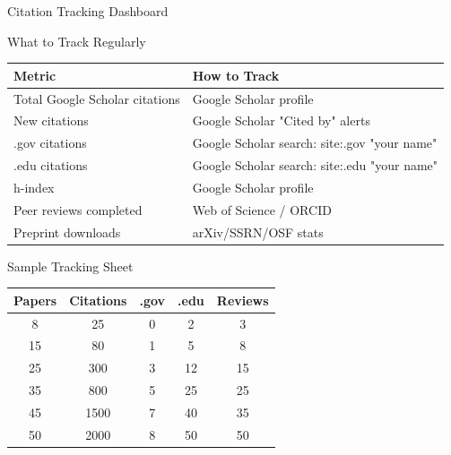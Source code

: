 \documentclass[11pt]{beamer}
\begin{document}
	\begin{frame}{Citation Tracking Dashboard}
		\scriptsize
		\begin{block}{What to Track Regularly}
			\centering
			\begin{tabular}{|p{4cm}|p{5.5cm}|}
				\hline
				\textbf{Metric} & \textbf{How to Track} \\
				\hline
				Total Google Scholar citations & Google Scholar profile \\
				\hline
				New citations & Google Scholar "Cited by" alerts \\
				\hline
				.gov citations & Google Scholar search: site:.gov "your name" \\
				\hline
				.edu citations & Google Scholar search: site:.edu "your name" \\
				\hline
				h-index & Google Scholar profile \\
				\hline
				Peer reviews completed & Web of Science / ORCID \\
				\hline
				Preprint downloads & arXiv/SSRN/OSF stats \\
				\hline
			\end{tabular}
		\end{block}
		\begin{block}{Sample Tracking Sheet}
			\centering
			\begin{tabular}{|c|c|c|c|c|}
				\hline
				\textbf{Papers} & \textbf{Citations} & \textbf{.gov} & \textbf{.edu} & \textbf{Reviews} \\
				\hline
				8 & 25 & 0 & 2 & 3 \\
				\hline
				15 & 80 & 1 & 5 & 8 \\
				\hline
				25 & 300 & 3 & 12 & 15 \\
				\hline
				35 & 800 & 5 & 25 & 25 \\
				\hline
				45 & 1500 & 7 & 40 & 35 \\
				\hline
				50 & 2000 & 8 & 50 & 50 \\
				\hline
			\end{tabular}
		\end{block}
	\end{frame}
	
\end{document}
